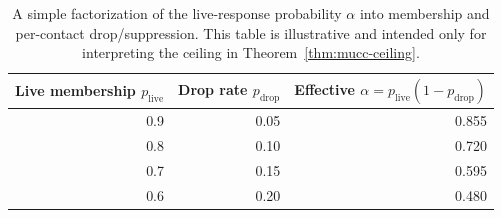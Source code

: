\documentclass[11pt]{article}
\begin{document}
\begin{table}[h]
\centering
{}
\caption{Illustrative lower bounds from Theorem~\ref{thm:mucc-ceiling} with $\beta=0.05$.
The required contact fraction depends mainly on $t/(\alpha d)$.
Values above $1$ indicate that no MUCC-marginal mechanism can meet the success target under the stated live factor.
}
\label{tab:mucc-numbers}
\end{table}


\begin{table}[h]
\centering
\begin{tabular}{@{}rrr@{}}
\toprule
Live membership $p_{\mathrm{live}}$ & Drop rate $p_{\mathrm{drop}}$ & Effective $\alpha=p_{\mathrm{live}}(1-p_{\mathrm{drop}})$ \\
\midrule
0.9 & 0.05 & 0.855 \\
0.8 & 0.10 & 0.720 \\
0.7 & 0.15 & 0.595 \\
0.6 & 0.20 & 0.480 \\
\bottomrule
\end{tabular}
\caption{A simple factorization of the live-response probability $\alpha$ into membership and per-contact drop/suppression.
This table is illustrative and intended only for interpreting the ceiling in Theorem~\ref{thm:mucc-ceiling}.}
\label{tab:alpha}
\end{table}
\end{document}
